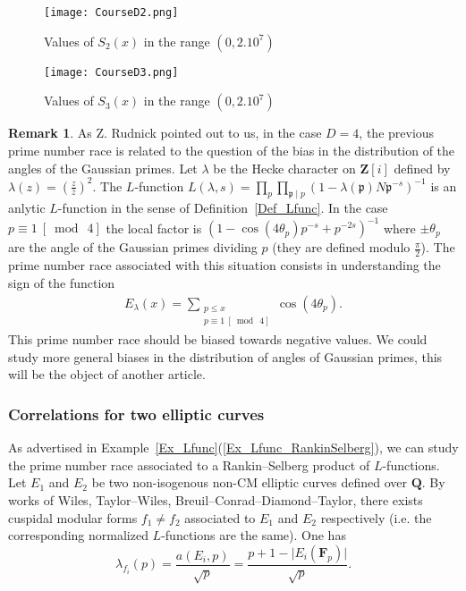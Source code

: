 \documentclass[a4paper,10pt]{amsart}
\theoremstyle{plain}
\theoremstyle{definition}
\newtheorem{Rk}{Remark}
\begin{document}
\begin{figure}
   \begin{minipage}[c]{.46\linewidth}
      \texttt{[image: CourseD2.png]}
      
      \caption{Values of $S_{2}(x)$ in the range $(0,2.10^{7})$}
      \label{fig_CourseD2}
   \end{minipage} \hfill
   \begin{minipage}[c]{.46\linewidth}
      \texttt{[image: CourseD3.png]}
      
      	\caption{Values of $S_{3}(x)$ in the range $(0,2.10^{7})$}
      	\label{fig_CourseD3}
   \end{minipage}
\end{figure}

\begin{Rk}
As Z. Rudnick pointed out to us, in the case $D=4$, the previous prime number race is related to the question of the bias in the distribution of the angles of the Gaussian primes.
Let $\lambda$ be the Hecke character on $\mathbf{Z}[i]$ defined by $\lambda(z) = \left(\frac{z}{\bar{z}}\right)^{2}$.
The $L$-function $L(\lambda,s) = \prod_{p} \prod_{\mathfrak{p}\mid p} (1 - \lambda(\mathfrak{p})N\mathfrak{p}^{-s})^{-1}$
is an anlytic $L$-function in the sense of Definition~\ref{Def_Lfunc}.
In the case $p\equiv 1\ [\bmod\ 4]$ the local factor is $(1 - \cos(4\theta_{p})p^{-s} + p^{-2s})^{-1}$
where $\pm\theta_{p}$ are the angle of the Gaussian primes dividing $p$ (they are defined modulo $\frac{\pi}{2}$).
The prime number race associated with this situation consists in understanding the sign of the function
\begin{align*}
E_{\lambda}(x) = \sum_{\substack{p\leq x\\ p\equiv 1\ [\bmod\ 4]}} \cos(4\theta_{p}).
\end{align*}
This prime number race should be biased towards negative values.
We could study more general biases in the distribution of angles of Gaussian primes, this will be the object of another article. 
\end{Rk}

\subsubsection{Correlations for two elliptic curves}\label{Ex_2ellcurves}

As advertised in Example~\ref{Ex_Lfunc}(\ref{Ex_Lfunc_RankinSelberg}),
we can study the prime number race associated to a Rankin--Selberg product of $L$-functions.
Let $E_{1}$ and $E_{2}$ be two non-isogenous non-CM elliptic curves defined over $\mathbf{Q}$.
By works of Wiles, Taylor--Wiles, Breuil--Conrad--Diamond--Taylor,
there exists cuspidal modular forms $f_{1}\neq f_{2}$ associated to $E_{1}$ and $E_{2}$ respectively
(i.e. the corresponding normalized $L$-functions are the same). 
One has 
$$\lambda_{f_{i}}(p) = \frac{a(E_{i},p)}{\sqrt{p}} = \frac{p+1 - \lvert E_{i}(\mathbf{F}_{p})\rvert}{\sqrt{p}}.$$
\end{document}

